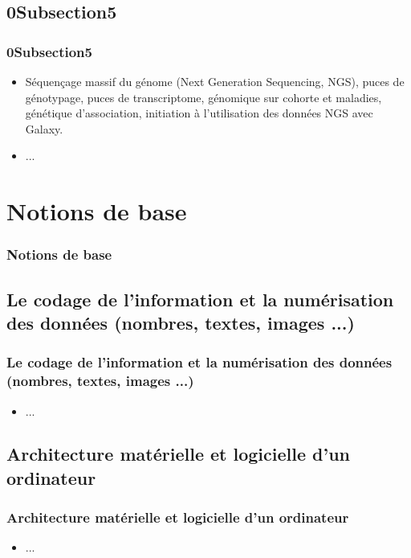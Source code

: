 \documentclass{beamer}
\begin{document}
\subsection{ \titleSection0Subsection5 }
\begin{frame}
	\frametitle{ \titleSection0Subsection5 }
	\begin{itemize}
		\item S{\'e}quen\c{c}age massif du g{\'e}nome  (Next Generation Sequencing, NGS), puces de g{\'e}notypage, puces de transcriptome, g{\'e}nomique sur cohorte et maladies, g{\'e}n{\'e}tique d'association, initiation {\`a} l'utilisation des donn{\'e}es NGS avec Galaxy.
		\item ... 
	\end{itemize}
\end{frame}



\def\titleSection1{Notions de base}
\section{ \titleSection1 }
\begin{frame}
	\frametitle{ \titleSection1 }
	\tableofcontents[sections=1,currentsection,subsectionstyle=show/shaded/hide]
\end{frame} 

\def\titleSection1SubsectionI{Le codage de l'information et la num{\'e}risation des donn{\'e}es (nombres, textes, images ...)}
\subsection{ \titleSection1SubsectionI }
\begin{frame}
	\frametitle{ \titleSection1SubsectionI }
	\begin{itemize}
		\item ... 
	\end{itemize}
\end{frame}

\def\titleSection1Subsection2{Architecture mat{\'e}rielle et logicielle d'un ordinateur}
\subsection{ \titleSection1Subsection2 }
\begin{frame}
	\frametitle{ \titleSection1Subsection2 }
	\begin{itemize}
		\item ... 
	\end{itemize}
\end{frame}
\end{document}
